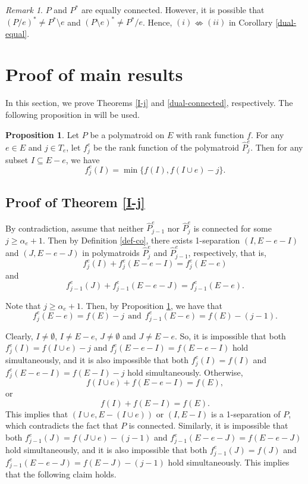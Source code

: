 \documentclass[preprint,10pt]{elsarticle}
\theoremstyle{plain}
\theoremstyle{definition}
\newtheorem{proposition}[theorem]{Proposition}
\theoremstyle{remark}
\newtheorem{remark}[theorem]{Remark}
\begin{document}
\begin{remark}
$P$ and $P^*$ are equally connected. However, it is possible that $(P/e)^*\neq P^*\setminus e$ and $(P\setminus e)^*\neq P^*/e$. Hence, $(i)\nLeftrightarrow(ii)$ in Corollary \ref{dual-equal}.
\end{remark}

 \section{Proof of main results}
\noindent

In this section, we prove Theorems \ref{I-j} and \ref{dual-connected}, respectively. The following proposition in \cite{Guan4} will be used.


\begin{proposition}\label{rank function of Pj}\cite{Guan4}
Let $P$ be a polymatroid on $E$ with rank function $f$. For any $e\in E$ and $j\in T_{e}$, let $f^{e}_{j}$ be the rank function of the polymatroid $\widehat{P}^{e}_{j}$. Then for any subset $I\subseteq E-e$, we have $$f^{e}_{j}(I)=\min\{f(I), f(I\cup e)-j\}.$$
\end{proposition}


 \subsection{Proof of Theorem \ref{I-j}}
\noindent

By contradiction, assume that neither  $\widehat{P}^{e}_{j-1}$ nor $\widehat{P}^{e}_{j}$ is  connected for some $j\geq \alpha_{e}+1$. Then  by Definition \ref{def-co}, there exists 1-separation $(I,E-e-I)$ and $(J,E-e-J)$  in polymatroids $\widehat{P}^{e}_{j}$ and $\widehat{P}^{e}_{j-1}$, respectively,
that is, $$f_{j}^e(I) + f_{j}^e(E-e-I)= f_{j}^e(E-e)$$ and
 $$f_{j-1}^e(J) + f_{j-1}^e(E-e-J) = f_{j-1}^e(E-e).$$

Note that $j\geq \alpha_{e}+1$. Then, by Proposition \ref{rank function of Pj}, we have that
\begin{equation*}\label{I}
f_{j}^e(E-e) = f(E)-j ~~\text{and}~~f_{j-1}^e(E-e) = f(E)-(j-1).
\end{equation*}

Clearly, $I\neq \emptyset$, $I\neq E-e$, $J\neq \emptyset$ and $J\neq E-e$. So, it is impossible that both \(f_{j}^e(I)= f(I\cup e)-j\) and \(f_{j}^e(E-e-I)=f(E-e-I)\) hold simultaneously, and it is also impossible that both  \(f_{j}^e(I)= f(I)\) and \(f_{j}^e(E-e-I)= f(E-I)-j\) hold simultaneously. Otherwise,
\begin{equation*}
f(I\cup e) + f(E-e-I) = f(E),
\end{equation*}
or
\begin{equation*}
f(I) + f(E-I) = f(E).
\end{equation*}
This implies that $(I \cup e,E-(I \cup  e))$ or $(I ,E-I)$ is a 1-separation of $P$, which  contradicts the fact that $P$ is connected. Similarly, it is impossible that both \(f_{j-1}^e(J)= f(J\cup e)-(j-1)\) and \(f_{j-1}^e(E-e-J)=f(E-e-J)\) hold simultaneously, and it is also impossible that both   \(f_{j-1}^e(J)= f(J)\) and \(f_{j-1}^e(E-e-J)= f(E-J)-(j-1)\) hold simultaneously. This implies that the following claim holds.
\end{document}
